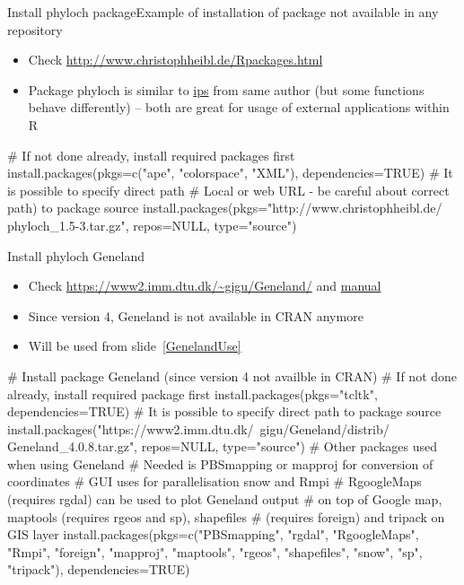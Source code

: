 \documentclass[compress, ucs, xelatex, 11pt, xcolor=svgnames,
  hyperref={
    bookmarks=true,
    unicode=true,
    colorlinks=true,
    pdftitle={Molecular data in R},
    plainpages=false,
    pdfauthor={Vojtech Zeisek},
    pdfsubject={Course about phylogeny and evolution in R},
    pdfcreator={XeLaTeX},
    pdfkeywords={R, evolution, phylogeny, molecular data},
    linkcolor=Tomato,
    anchorcolor=SaddleBrown,
    citecolor=Goldenrod,
    filecolor=DarkMagenta,
    menucolor=Sienna,
    urlcolor=DarkTurquoise,
    pdftex},
  url={hyphens, lowtilde} %
  ]{beamer}
\begin{document}
\begin{frame}[fragile]{Install phyloch package}{Example of installation of package not available in any repository}
  \label{phyloch}
  \begin{itemize}
    \item Check \url{http://www.christophheibl.de/Rpackages.html} 
    \item Package phyloch is similar to \href{https://cran.r-project.org/web/packages/ips/}{ips} from same author (but some functions behave differently) -- both are great for usage of external applications within R
  \end{itemize}
  \begin{spluscode}
    # If not done already, install required packages first
    install.packages(pkgs=c("ape", "colorspace", "XML"),
      dependencies=TRUE)
    # It is possible to specify direct path
    # Local or web URL - be careful about correct path) to package source
    install.packages(pkgs="http://www.christophheibl.de/
      phyloch_1.5-3.tar.gz", repos=NULL, type="source")
  \end{spluscode}
\end{frame}

\begin{frame}[fragile]{Install phyloch Geneland}
  \label{Geneland}
  \begin{itemize}
    \item Check \url{https://www2.imm.dtu.dk/~gigu/Geneland/} and \href{https://www2.imm.dtu.dk/~gigu/Geneland/Geneland-Doc.pdf}{manual}
    \item Since version 4, Geneland is not available in CRAN anymore
    \item Will be used from slide~\ref{GenelandUse}
  \end{itemize}
  \begin{spluscode}
    # Install package Geneland (since version 4 not availble in CRAN)
    # If not done already, install required package first
    install.packages(pkgs="tcltk", dependencies=TRUE)
    # It is possible to specify direct path to package source
    install.packages("https://www2.imm.dtu.dk/~gigu/Geneland/distrib/
      Geneland_4.0.8.tar.gz", repos=NULL, type="source")
    # Other packages used when using Geneland
    # Needed is PBSmapping or mapproj for conversion of coordinates
    # GUI uses for parallelisation snow and Rmpi
    # RgoogleMaps (requires rgdal) can be used to plot Geneland output
    # on top of Google map, maptools (requires rgeos and sp), shapefiles
    # (requires foreign) and tripack on GIS layer
    install.packages(pkgs=c("PBSmapping", "rgdal", "RgoogleMaps", "Rmpi",
      "foreign", "mapproj", "maptools", "rgeos", "shapefiles", "snow", "sp",
      "tripack"), dependencies=TRUE)
  \end{spluscode}
\end{frame}
\end{document}
